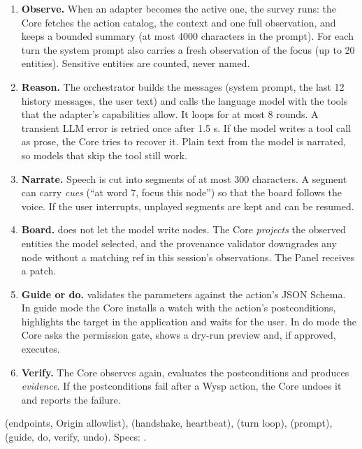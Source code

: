 \begin{enumerate}[leftmargin=1.4em]
  \item \textbf{Observe.} When an adapter becomes the active one, the survey runs: the Core fetches the action catalog, the context and one full observation, and keeps a bounded summary (at most 4000 characters in the prompt). For each turn the system prompt also carries a fresh observation of the focus (up to 20 entities). Sensitive entities are counted, never named.
  \item \textbf{Reason.} The orchestrator builds the messages (system prompt, the last 12 history messages, the user text) and calls the language model with the tools that the adapter's capabilities allow. It loops for at most 8 rounds. A transient LLM error is retried once after 1.5 s. If the model writes a tool call as prose, the Core tries to recover it. Plain text from the model is narrated, so models that skip the  tool still work.
  \item \textbf{Narrate.} Speech is cut into segments of at most 300 characters. A segment can carry \emph{cues} (``at word 7, focus this node'') so that the board follows the voice. If the user interrupts, unplayed segments are kept and can be resumed.
  \item \textbf{Board.}  does not let the model write nodes. The Core \emph{projects} the observed entities the model selected, and the provenance validator downgrades any \pobs{} node without a matching ref in this session's observations. The Panel receives a patch.
  \item \textbf{Guide or do.}  validates the parameters against the action's JSON Schema. In guide mode the Core installs a watch with the action's postconditions, highlights the target in the application and waits for the user. In do mode the Core asks the permission gate, shows a dry-run preview and, if approved, executes.
  \item \textbf{Verify.} The Core observes again, evaluates the postconditions and produces \emph{evidence}. If the postconditions fail after a Wysp action, the Core undoes it and reports the failure.
\end{enumerate}

\begin{wherebox}
 (endpoints, Origin allowlist),  (handshake, heartbeat),  (turn loop),  (prompt),  (guide, do, verify, undo). Specs: .
\end{wherebox}



